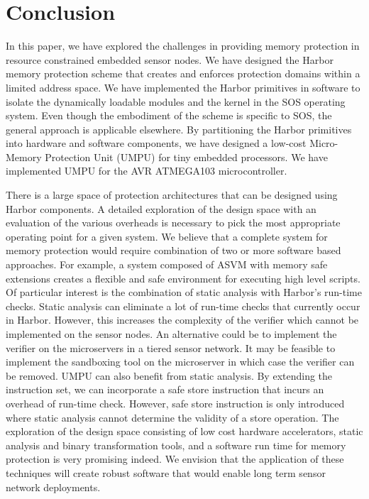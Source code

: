 \section{Conclusion}
\label{sec:conclude}
%
In this paper, we have explored the challenges in providing memory
protection in resource constrained embedded sensor nodes.
%
We have designed the Harbor memory protection scheme that creates and
enforces protection domains within a limited address space.
%
We have implemented the Harbor primitives in software to isolate the
dynamically loadable modules and the kernel in the SOS operating
system.
%
Even though the embodiment of the scheme is specific to SOS, the
general approach is applicable elsewhere.
%
By partitioning the Harbor primitives into hardware and software
components, we have designed a low-cost Micro-Memory Protection Unit
(UMPU) for tiny embedded processors.
%
We have implemented UMPU for the AVR ATMEGA103 microcontroller.
%

There is a large space of protection architectures that can be
designed using Harbor components.
%
A detailed exploration of the design space with an evaluation of the
various overheads is necessary to pick the most appropriate operating
point for a given system.
%
We believe that a complete system for memory protection would require
combination of two or more software based approaches.
% 
For example, a system composed of ASVM with memory safe extensions
creates a flexible and safe environment for executing high level
scripts.
%
Of particular interest is the combination of static analysis with
Harbor's run-time checks.
%
Static analysis can eliminate a lot of run-time checks that currently
occur in Harbor.
%
However, this increases the complexity of the verifier which cannot be
implemented on the sensor nodes.
%
An alternative could be to implement the verifier on the microservers
in a tiered sensor network.
%
It may be feasible to implement the sandboxing tool on the
microserver in which case the verifier can be removed.
%
UMPU can also benefit from static analysis.
%
By extending the instruction set, we can incorporate a safe store
instruction that incurs an overhead of run-time check.
%
However, safe store instruction is only introduced where static
analysis cannot determine the validity of a store operation.
%
The exploration of the design space consisting of low cost hardware
accelerators, static analysis and binary transformation tools, and a
software run time for memory protection is very promising indeed.
%
We envision that the application of these techniques will create
robust software that would enable long term sensor network
deployments.

